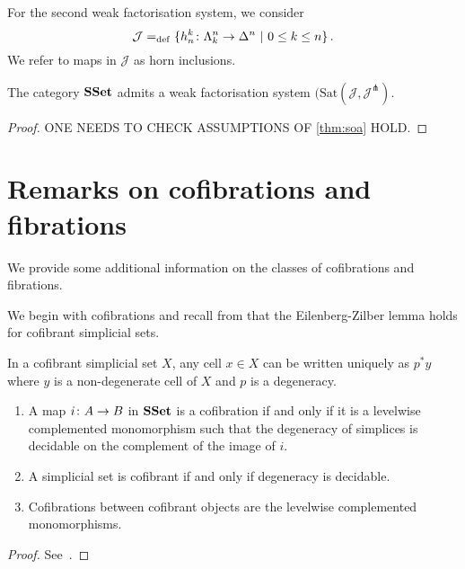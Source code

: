 \documentclass[reqno,10pt,a4paper,oneside,draft]{amsart}
\begin{document}
\bigskip


For the second weak factorisation system, we consider 
\[
\mathcal{J} =_{\operatorname{def}} \{ h^k_n  \colon \Lambda^n_k \to \Delta^{n} \ | \ 0 \leq k \leq n \} \, .
\]
We refer to maps in $\mathcal{J}$ as horn inclusions.

\begin{proposition} The category $\mathbf{SSet}$ admits a weak factorisation system $(\mathrm{Sat}(\mathcal{J}, 
\mathcal{J}^\pitchfork)$.
\end{proposition}

\begin{proof} ONE NEEDS TO CHECK ASSUMPTIONS OF \cref{thm:soa} HOLD.
\end{proof}



\section{Remarks on cofibrations and fibrations}

We provide some additional information on the classes of cofibrations and fibrations. 

\bigskip

We begin with cofibrations and recall from \cite[\S5.1.5]{henry2018wms} that the Eilenberg-Zilber lemma holds for cofibrant simplicial sets.

\begin{lemma}
\label{lem:EZ_cof}
In a cofibrant simplicial set $X$, any cell $x \in X$ can be written uniquely as $p^* y$ where $y$ is a non-degenerate cell of $X$ and $p$ is a degeneracy.
\end{lemma}


\begin{proposition} \hfill 
\begin{enumerate}[$(i)$]
\item A map $i \colon A \to B$ in $\mathbf{SSet}$ is a cofibration if and only if it is a levelwise complemented monomorphism such that the degeneracy of simplices is decidable on the complement of the image of $i$. 
\item A simplicial set is cofibrant if and only if degeneracy is decidable.
\item Cofibrations between cofibrant
objects are the levelwise complemented monomorphisms.
\end{enumerate}
\end{proposition}

\begin{proof} See~\cite[Proposition 5.1.7]{henry2018wms}.
\end{proof}
\end{document}

